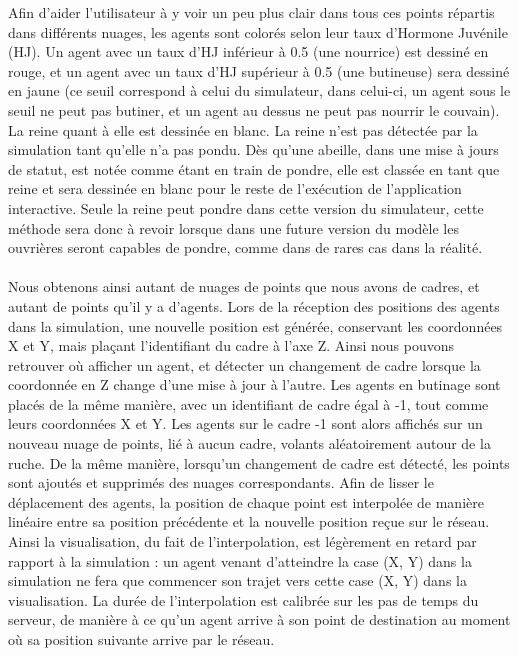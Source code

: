 		Afin d'aider l'utilisateur à y voir un peu plus clair dans tous ces points répartis dans différents nuages, les agents sont colorés selon leur taux d'Hormone Juvénile (HJ). Un agent avec un taux d'HJ inférieur à 0.5 (une nourrice) est dessiné en rouge, et un agent avec un taux d'HJ supérieur à 0.5 (une butineuse) sera dessiné en jaune (ce seuil correspond à celui du simulateur, dans celui-ci, un agent sous le seuil ne peut pas butiner, et un agent au dessus ne peut pas nourrir le couvain). La reine quant à elle est dessinée en blanc. La reine n'est pas détectée par la simulation tant qu'elle n'a pas pondu. Dès qu'une abeille, dans une mise à jours de statut, est notée comme étant en train de pondre, elle est classée en tant que reine et sera dessinée en blanc pour le reste de l'exécution de l'application interactive. Seule la reine peut pondre dans cette version du simulateur, cette méthode sera donc à revoir lorsque dans une future version du modèle les ouvrières seront capables de pondre, comme dans de rares cas dans la réalité.
		
		\paragraph{}
		Nous obtenons ainsi autant de nuages de points que nous avons de cadres, et autant de points qu'il y a d'agents. Lors de la réception des positions des agents dans la simulation, une nouvelle position est générée, conservant les coordonnées X et Y, mais plaçant l'identifiant du cadre à l'axe Z. Ainsi nous pouvons retrouver où afficher un agent, et détecter un changement de cadre lorsque la coordonnée en Z change d'une mise à jour à l'autre. Les agents en butinage sont placés de la même manière, avec un identifiant de cadre égal à -1, tout comme leurs coordonnées X et Y. Les agents sur le cadre -1 sont alors affichés sur un nouveau nuage de points, lié à aucun cadre, volants aléatoirement autour de la ruche. De la même manière, lorsqu'un changement de cadre est détecté, les points sont ajoutés et supprimés des nuages correspondants. Afin de lisser le déplacement des agents, la position de chaque point est interpolée de manière linéaire entre sa position précédente et la nouvelle position reçue sur le réseau. Ainsi la visualisation, du fait de l'interpolation, est légèrement en retard par rapport à la simulation : un agent venant d'atteindre la case (X, Y) dans la simulation ne fera que commencer son trajet vers cette case (X, Y) dans la visualisation. La durée de l'interpolation est calibrée sur les pas de temps du serveur, de manière à ce qu'un agent arrive à son point de destination au moment où sa position suivante arrive par le réseau.
	
